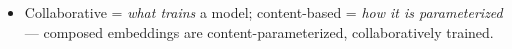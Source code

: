 \begin{itemize}
    \item Collaborative = \emph{what trains} a model; content-based = \emph{how it is parameterized} — composed embeddings are content-parameterized, collaboratively trained. 

\end{itemize}
